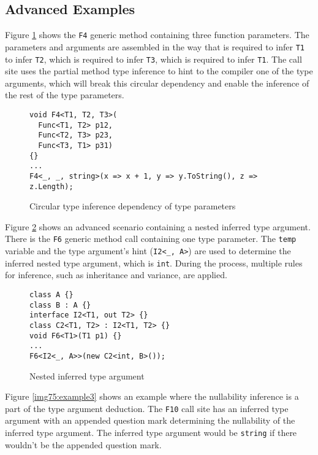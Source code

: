 \newpage

\subsection{Advanced Examples}

Figure \ref{img73:example1} shows the \texttt{F4} generic method containing three function parameters. 
The parameters and arguments are assembled in the way that is required to infer \texttt{T1} to infer \texttt{T2}, which is required to infer \texttt{T3}, which is required to infer \texttt{T1}. 
The call site uses the partial method type inference to hint to the compiler one of the type arguments, which will break this circular dependency and enable the inference of the rest of the type parameters.
\begin{figure}[!h]
\begin{lstlisting}[style=csharp, showstringspaces=false]
void F4<T1, T2, T3>(
  Func<T1, T2> p12, 
  Func<T2, T3> p23, 
  Func<T3, T1> p31) 
{}
...
F4<_, _, string>(x => x + 1, y => y.ToString(), z => z.Length); 
\end{lstlisting}
\caption{Circular type inference dependency of type parameters}
\label{img73:example1}
\end{figure}
\par
Figure \ref{img74:example2} shows an advanced scenario containing a nested inferred type argument.
There is the \texttt{F6} generic method call containing one type parameter.
The \texttt{temp} variable and the type argument’s hint (\texttt{I2<\_, A>}) are used to determine the inferred nested type argument, which is \texttt{int}.
During the process, multiple rules for inference, such as inheritance and variance, are applied.
\begin{figure}[!h]
\begin{lstlisting}[style=csharp, showstringspaces=false]
class A {}
class B : A {}
interface I2<T1, out T2> {}
class C2<T1, T2> : I2<T1, T2> {}
void F6<T1>(T1 p1) {}
...
F6<I2<_, A>>(new C2<int, B>());
\end{lstlisting}
\caption{Nested inferred type argument}
\label{img74:example2}
\end{figure}
\par
Figure \ref{img75:example3} shows an example where the nullability inference is a part of the type argument deduction.
The \texttt{F10} call site has an inferred type argument with an appended question mark determining the nullability of the inferred type argument. 
The inferred type argument would be \texttt{string} if there wouldn't be the appended question mark. 
